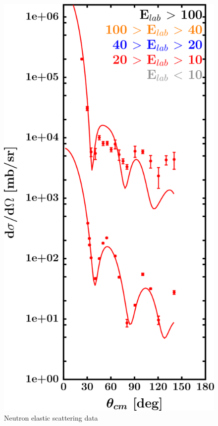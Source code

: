 \begin{figure}[H]
\begin{minipage}{0.45\textwidth}
    \end{minipage}\hfill
    \begin{minipage}{0.45\textwidth}
        \centering
        \includegraphics[width=1.0\textwidth]{figures/sn112_neutronElastic.png}
        \caption{Neutron elastic scattering data}
        \label{DOMFitData_sn112_neutron_elastic}
    \end{minipage}
\end{figure}

